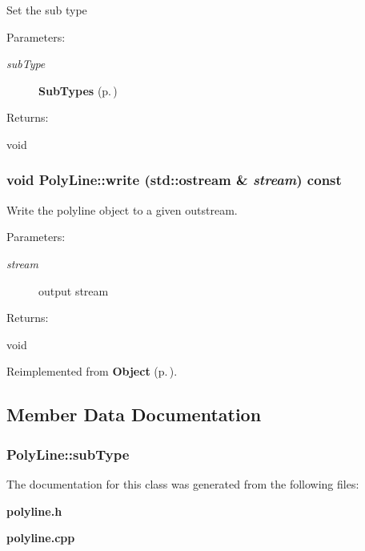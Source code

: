 Set the sub type \begin{Desc}
\item[Parameters: ]\par
\begin{description}
\item[{\em 
sub\-Type}]{\bf Sub\-Types} {\rm (p.\,\pageref{classPolyLine_s5})} \end{description}
\end{Desc}
\begin{Desc}
\item[Returns: ]\par
void \end{Desc}
\subsubsection{\setlength{\rightskip}{0pt plus 5cm}void Poly\-Line::write (std::ostream \& {\em stream}) const\hspace{0.3cm}{\tt  [virtual]}}\label{classPolyLine_a4}


Write the polyline object to a given outstream. \begin{Desc}
\item[Parameters: ]\par
\begin{description}
\item[{\em 
stream}]output stream \end{description}
\end{Desc}
\begin{Desc}
\item[Returns: ]\par
void \end{Desc}


Reimplemented from {\bf Object} {\rm (p.\,\pageref{classObject_a3})}.

\subsection{Member Data Documentation}
\subsubsection{ Poly\-Line::sub\-Type\hspace{0.3cm}{\tt  [private]}}\label{classPolyLine_o0}




The documentation for this class was generated from the following files:\begin{CompactItemize}
\item 
{\bf polyline.h}\item 
{\bf polyline.cpp}\end{CompactItemize}
